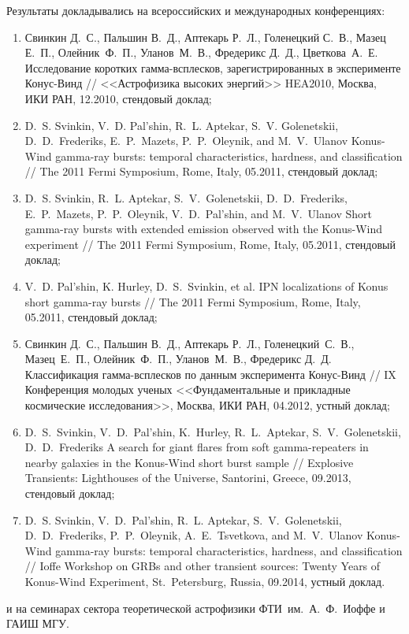 Результаты докладывались на всероссийских и международных конференциях: 
\begin{enumerate}
\item Свинкин Д.~С., Пальшин В.~Д., Аптекарь Р.~Л., Голенецкий С.~В., Мазец Е.~П., 
    Олейник~Ф.~П., Уланов~М.~В., Фредерикс Д.~Д., Цветкова~А.~Е.  
    Исследование коротких гамма-всплесков, зарегистрированных в эксперименте Конус-Винд //
    <<Астрофизика высоких энергий>> HEA2010, Москва, ИКИ РАН, 12.2010, стендовый доклад;
\item D.~S. Svinkin, V.~D. Pal'shin, R.~L. Aptekar, S.~V. Golenetskii, D.~D.~Frederiks, 
    E.~P.~Mazets, P.~P.~Oleynik, and M.~V.~Ulanov 
    Konus-Wind gamma-ray bursts: temporal characteristics, hardness, and classification //
    The 2011 Fermi Symposium, Rome, Italy, 05.2011, стендовый доклад;
\item D.~S. Svinkin, R.~L. Aptekar, S.~V.~Golenetskii, D.~D.~Frederiks, E.~P.~Mazets,
    P.~P.~Oleynik, V.~D.~Pal'shin, and M.~V.~Ulanov  
    Short gamma-ray bursts with extended emission observed with the Konus-Wind experiment //
    The 2011 Fermi Symposium, Rome, Italy, 05.2011, стендовый доклад;
\item V.~D. Pal'shin, K. Hurley, D.~S.~Svinkin, et al. 
    IPN localizations of Konus short gamma-ray bursts // 
    The 2011 Fermi Symposium, Rome, Italy, 05.2011, стендовый доклад;
\item Свинкин Д.~С., Пальшин В.~Д., Аптекарь Р.~Л., Голенецкий~С.~В., Мазец~Е.~П., 
    Олейник~Ф.~П., Уланов~М.~В., Фредерикс Д.~Д.  
    Классификация гамма-всплесков по данным эксперимента Конус-Винд //
    IX Конференция молодых ученых <<Фундаментальные и прикладные космические исследования>>, 
    Москва, ИКИ РАН, 04.2012, устный доклад;
\item D.~S.~Svinkin, V.~D.~Pal'shin, K.~Hurley, R.~L.~Aptekar, S.~V.~Golenetskii, D.~D.~Frederiks
    A search for giant flares from soft gamma-repeaters in nearby galaxies in the Konus-Wind short burst sample //
    Explosive Transients: Lighthouses of the Universe, Santorini, Greece, 09.2013, стендовый доклад;
\item D.~S. Svinkin, V.~D.~Pal'shin, R.~L. Aptekar, S.~V.~Golenetskii, D.~D.~Frederiks, 
    P.~P.~Oleynik, A.~E.~Tsvetkova, and M.~V.~Ulanov
    Konus-Wind gamma-ray bursts: temporal characteristics, hardness, and classification //
    Ioffe Workshop on GRBs and other transient sources: Twenty Years of Konus-Wind Experiment, 
    St.~Petersburg, Russia, 09.2014, устный доклад.
\end{enumerate}
и на семинарах сектора теоретической астрофизики ФТИ~им.~А.~Ф.~Иоффе и ГАИШ МГУ.

